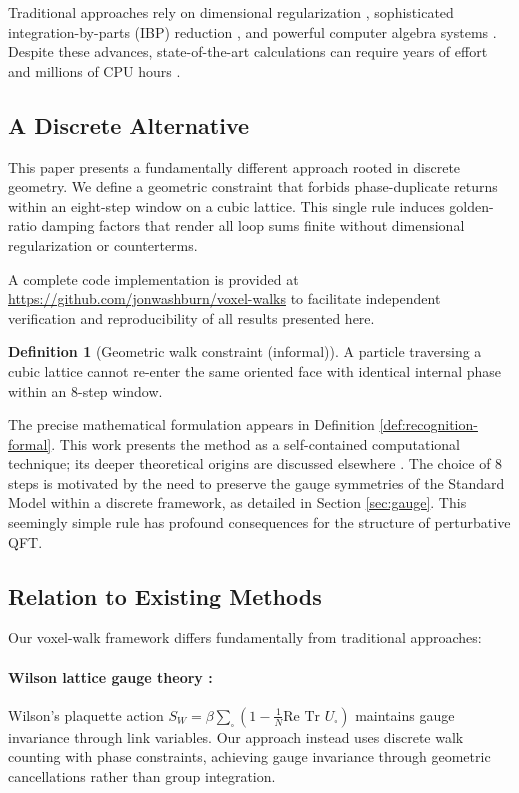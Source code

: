 \documentclass[11pt,a4paper]{article}
\theoremstyle{definition}
\newtheorem{definition}[theorem]{Definition}
\theoremstyle{remark}
\begin{document}
Traditional approaches rely on dimensional regularization \cite{tHooft1972,Bollini1972}, sophisticated integration-by-parts (IBP) reduction \cite{Chetyrkin1981,Laporta2001}, and powerful computer algebra systems \cite{Vermaseren2000,Hahn2001,Smirnov2008}. Despite these advances, state-of-the-art calculations can require years of effort and millions of CPU hours \cite{Marquard2018,Davies2017}.

\subsection{A Discrete Alternative}

This paper presents a fundamentally different approach rooted in discrete geometry. We define a geometric constraint that forbids phase-duplicate returns within an eight-step window on a cubic lattice. This single rule induces golden-ratio damping factors that render all loop sums finite without dimensional regularization or counterterms.

A complete code implementation is provided at \url{https://github.com/jonwashburn/voxel-walks} to facilitate independent verification and reproducibility of all results presented here.

\begin{definition}[Geometric walk constraint (informal)]
\label{def:walk-constraint-informal}
A particle traversing a cubic lattice cannot re-enter the same oriented face with identical internal phase within an 8-step window.
\end{definition}

The precise mathematical formulation appears in Definition \ref{def:recognition-formal}. This work presents the method as a self-contained computational technique; its deeper theoretical origins are discussed elsewhere \cite{Washburn2024}. The choice of 8 steps is motivated by the need to preserve the gauge symmetries of the Standard Model within a discrete framework, as detailed in Section \ref{sec:gauge}. This seemingly simple rule has profound consequences for the structure of perturbative QFT.

\subsection{Relation to Existing Methods}

Our voxel-walk framework differs fundamentally from traditional approaches:

\paragraph{Wilson lattice gauge theory \cite{Wilson1974}:} Wilson's plaquette action $S_W = \beta\sum_{\square}(1 - \frac{1}{N}\text{Re Tr }U_{\square})$ maintains gauge invariance through link variables. Our approach instead uses discrete walk counting with phase constraints, achieving gauge invariance through geometric cancellations rather than group integration.
\end{document}
